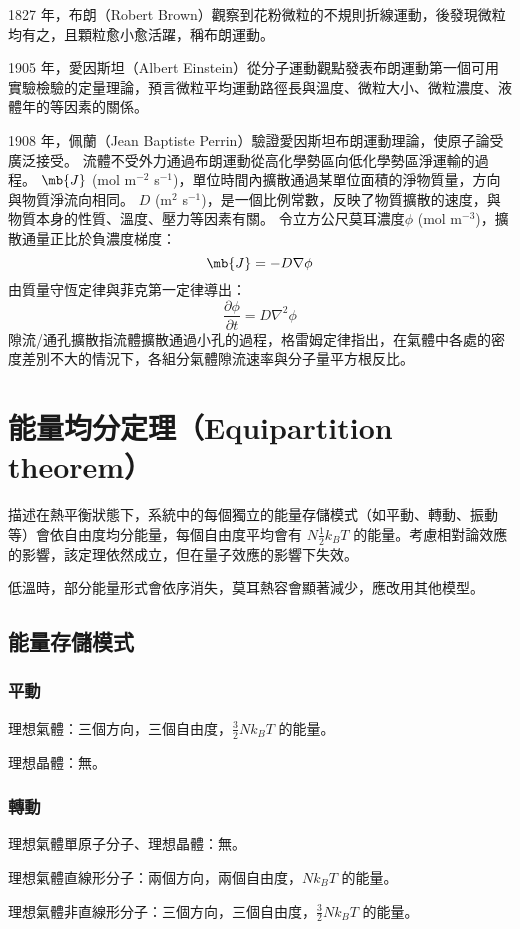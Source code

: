 \documentclass[a4paper,12pt]{report}
\begin{document}
\bit
\item 1827 年，布朗（Robert Brown）觀察到花粉微粒的不規則折線運動，後發現微粒均有之，且顆粒愈小愈活躍，稱布朗運動。
\item 1905 年，愛因斯坦（Albert Einstein）從分子運動觀點發表布朗運動第一個可用實驗檢驗的定量理論，預言微粒平均運動路徑長與溫度、微粒大小、微粒濃度、液體年的等因素的關係。
\item 1908 年，佩蘭（Jean Baptiste Perrin）驗證愛因斯坦布朗運動理論，使原子論受廣泛接受。
\eit
{}
流體不受外力通過布朗運動從高化學勢區向低化學勢區淨運輸的過程。
$\mb{J}$ (mol m$^{-2}$ s$^{-1}$)，單位時間內擴散通過某單位面積的淨物質量，方向與物質淨流向相同。
$D$ (m$^2$ s$^{-1}$)，是一個比例常數，反映了物質擴散的速度，與物質本身的性質、溫度、壓力等因素有關。
令立方公尺莫耳濃度$\phi$ (mol m$^{-3}$)，擴散通量正比於負濃度梯度：
\[\mb{J}=-D\nabla\phi\]
由質量守恆定律與菲克第一定律導出：
\[\frac{\partial\phi}{\partial t}=D\nabla^2\phi\]
隙流/通孔擴散指流體擴散通過小孔的過程，格雷姆定律指出，在氣體中各處的密度差別不大的情況下，各組分氣體隙流速率與分子量平方根反比。


\section{能量均分定理（Equipartition theorem）}
描述在熱平衡狀態下，系統中的每個獨立的能量存儲模式（如平動、轉動、振動等）會依自由度均分能量，每個自由度平均會有 \( N \frac{1}{2} k_B T \) 的能量。考慮相對論效應的影響，該定理依然成立，但在量子效應的影響下失效。

低溫時，部分能量形式會依序消失，莫耳熱容會顯著減少，應改用其他模型。
\subsection{能量存儲模式}
\subsubsection{平動}
\bit
\item 理想氣體：三個方向，三個自由度，\( \frac{3}{2}Nk_BT \) 的能量。
\item 理想晶體：無。
\eit
\subsubsection{轉動}
\bit
\item 理想氣體單原子分子、理想晶體：無。
\item 理想氣體直線形分子：兩個方向，兩個自由度，\( Nk_BT \) 的能量。
\item 理想氣體非直線形分子：三個方向，三個自由度，\( \frac{3}{2} Nk_BT \) 的能量。
\eit
\end{document}
